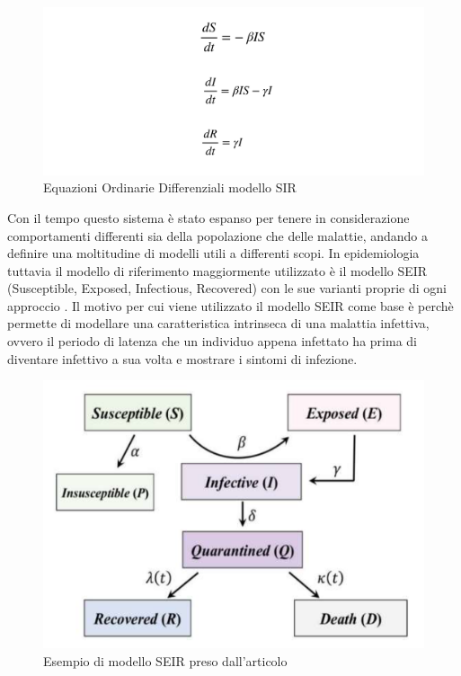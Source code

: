 \begin{figure}
    \includegraphics[width=\linewidth]{img/ode.png}
    \caption{Equazioni Ordinarie Differenziali modello SIR} 
    \label{fig:ODE_SIR}
\end{figure}

Con il tempo questo sistema è stato espanso per tenere in considerazione comportamenti
differenti sia della popolazione che delle malattie, andando a definire una moltitudine
di modelli utili a differenti scopi. In epidemiologia tuttavia il modello di
riferimento maggiormente utilizzato è il modello SEIR (Susceptible, Exposed, Infectious, Recovered)
con le sue varianti proprie di ogni approccio \cite{Mwalili2020} \cite{ijerph17103535} \cite{Bjornstad2020}. 
Il motivo per cui viene utilizzato il modello SEIR come base è perchè permette di 
modellare una caratteristica intrinseca di una malattia infettiva, ovvero 
il periodo di latenza che un individuo appena infettato ha prima di diventare 
infettivo a sua volta e mostrare i sintomi di infezione. 

\begin{figure}
    \includegraphics[width=\linewidth]{img/ijerph-17-03535-g001.png}
    \caption{Esempio di modello SEIR preso dall'articolo \cite{ijerph17103535}}
    \label{fig:SEIR_model}
\end{figure}

